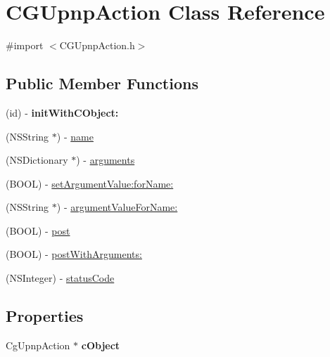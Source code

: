 \hypertarget{interface_c_g_upnp_action}{\section{C\-G\-Upnp\-Action Class Reference}
\label{interface_c_g_upnp_action}
}


{\ttfamily \#import $<$C\-G\-Upnp\-Action.\-h$>$}

\subsection*{Public Member Functions}
\begin{DoxyCompactItemize}
\item 
\hypertarget{interface_c_g_upnp_action_a00e2781861f80c1a825cfbcae2ca029e}{(id) -\/ {\bfseries init\-With\-C\-Object\-:}}\label{interface_c_g_upnp_action_a00e2781861f80c1a825cfbcae2ca029e}

\item 
(N\-S\-String $\ast$) -\/ \hyperlink{interface_c_g_upnp_action_a2346d614e2444c496af06c7a36fb76c4}{name}
\item 
(N\-S\-Dictionary $\ast$) -\/ \hyperlink{interface_c_g_upnp_action_af6de7e0e090933412570a448ad76a23d}{arguments}
\item 
(B\-O\-O\-L) -\/ \hyperlink{interface_c_g_upnp_action_a00b84e0f87a1779d64d730aae84afd8a}{set\-Argument\-Value\-:for\-Name\-:}
\item 
(N\-S\-String $\ast$) -\/ \hyperlink{interface_c_g_upnp_action_a907d7fa75697852f78360c9aadd812bf}{argument\-Value\-For\-Name\-:}
\item 
(B\-O\-O\-L) -\/ \hyperlink{interface_c_g_upnp_action_acfe2d4938cf192b5f8a21056cc7bc2b8}{post}
\item 
(B\-O\-O\-L) -\/ \hyperlink{interface_c_g_upnp_action_ac9b7461e9d2c234013d6aab8ede880e3}{post\-With\-Arguments\-:}
\item 
(N\-S\-Integer) -\/ \hyperlink{interface_c_g_upnp_action_a7aede2e0802cbb86cace48a9061d378b}{status\-Code}
\end{DoxyCompactItemize}
\subsection*{Properties}
\begin{DoxyCompactItemize}
\item 
\hypertarget{interface_c_g_upnp_action_af3e57bb15e4094597d5415d55cb903e3}{Cg\-Upnp\-Action $\ast$ {\bfseries c\-Object}}\label{interface_c_g_upnp_action_af3e57bb15e4094597d5415d55cb903e3}

\end{DoxyCompactItemize}


